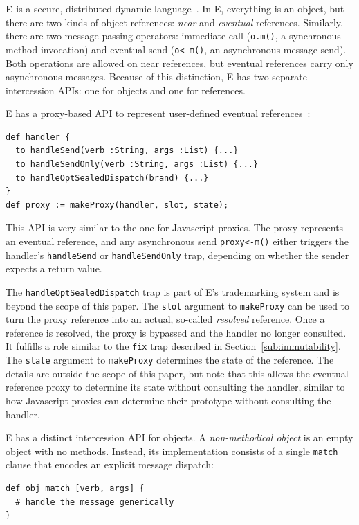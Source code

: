 \documentclass{sig-alternate}
\begin{document}
\textbf{E} is a secure, distributed dynamic language~\cite{miller05concurrency}. In E, everything is an object, but there are two kinds of object references: \emph{near} and \emph{eventual} references. Similarly, there are two message passing operators: immediate call (\lstinline{o.m()}, a synchronous method invocation) and eventual send (\lstinline{o<-m()}, an asynchronous message send). Both operations are allowed on near references, but eventual references carry only asynchronous messages. Because of this distinction, E has two separate intercession APIs: one for objects and one for references.

E has a proxy-based API to represent user-defined eventual references~\cite{eproxies}:

\begin{lstlisting}[]
def handler {
  to handleSend(verb :String, args :List) {...}
  to handleSendOnly(verb :String, args :List) {...}
  to handleOptSealedDispatch(brand) {...}
}
def proxy := makeProxy(handler, slot, state);
\end{lstlisting}

This API is very similar to the one for Javascript proxies. The proxy represents an eventual reference, and any asynchronous send \texttt{proxy<-m()} either triggers the handler's \texttt{handleSend} or \texttt{handleSendOnly} trap, depending on whether the sender expects a return value.

The \texttt{handleOptSealedDispatch} trap is part of E's trademarking system and is beyond the scope of this paper. The \texttt{slot} argument to \texttt{makeProxy} can be used to turn the proxy reference into an actual, so-called \emph{resolved} reference. Once a reference is resolved, the proxy is bypassed and the handler no longer consulted. It fulfills a role similar to the \texttt{fix} trap described in Section~\ref{sub:immutability}. The \texttt{state} argument to \texttt{makeProxy} determines the state of the reference. The details are outside the scope of this paper, but note that this allows the eventual reference proxy to determine its state without consulting the handler, similar to how Javascript proxies can determine their prototype without consulting the handler.

E has a distinct intercession API for objects. A \emph{non-methodical object} is an empty object with no methods. Instead, its implementation consists of a single \texttt{match} clause that encodes an explicit message dispatch:

\begin{lstlisting}
def obj match [verb, args] {
  # handle the message generically
}
\end{lstlisting}
\end{document}
